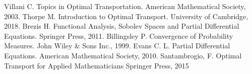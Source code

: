 \documentclass[12pt]{article}
\theoremstyle{plain}
\numberwithin{equation}{section}
\begin{document}
\begin{thebibliography}{9}
Villani C.
Topics in Optimal Transportation.
American Mathematical Society, 2003.
Thorpe M.
Introduction to Optimal Transport.
University of Cambridge, 2018.
Brezis H.
Functional Analysis, Sobolev Spaces and Partial Differential Equations. 
Springer Press, 2011.
Billingsley P.
Convergence of Probability Measures.
John Wiley \& Sons Inc., 1999.
Evans C. L.
Partial Differential Equations.
American Mathematical Society, 2010.
Santambrogio, F.
Optimal Transport for Applied Mathematicians
Springer Press, 2015
\end{thebibliography}
\end{document}
